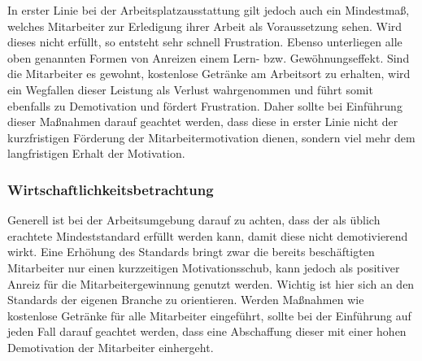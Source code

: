 In erster Linie bei der Arbeitsplatzausstattung gilt jedoch auch ein Mindestmaß, welches Mitarbeiter zur Erledigung ihrer Arbeit als Voraussetzung sehen. Wird dieses nicht erfüllt, so entsteht sehr schnell Frustration. Ebenso unterliegen alle oben genannten Formen von Anreizen einem Lern- bzw. Gewöhnungseffekt. Sind die Mitarbeiter es gewohnt, kostenlose Getränke am Arbeitsort zu erhalten, wird ein Wegfallen dieser Leistung als Verlust wahrgenommen und führt somit ebenfalls zu Demotivation und fördert Frustration. Daher sollte bei Einführung dieser Maßnahmen darauf geachtet werden, dass diese in erster Linie nicht der kurzfristigen Förderung der Mitarbeitermotivation dienen, sondern viel mehr dem langfristigen Erhalt der Motivation.

\subsubsection{Wirtschaftlichkeitsbetrachtung}
Generell ist bei der Arbeitsumgebung darauf zu achten, dass der als üblich erachtete Mindeststandard erfüllt werden kann, damit diese nicht demotivierend wirkt. Eine Erhöhung des Standards bringt zwar die bereits beschäftigten Mitarbeiter nur einen kurzzeitigen Motivationsschub, kann jedoch als positiver Anreiz für die Mitarbeitergewinnung genutzt werden. Wichtig ist hier sich an den Standards der eigenen Branche zu orientieren. Werden Maßnahmen wie kostenlose Getränke für alle Mitarbeiter eingeführt, sollte bei der Einführung auf jeden Fall darauf geachtet werden, dass eine Abschaffung dieser mit einer hohen Demotivation der Mitarbeiter einhergeht.